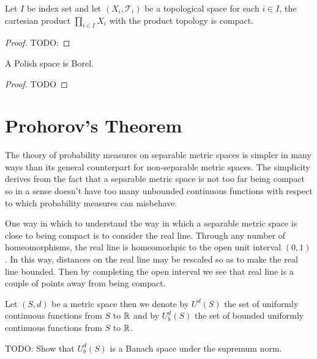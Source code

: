 \begin{thm}\label{Tychonoff}Let $I$ be index set
  and let $(X_i,
  \mathcal{T}_i)$ be a topological space for each $i \in I$, the
  cartesian product $\prod_{i \in I} X_i$ with the product topology is
  compact.
\end{thm}
\begin{proof}
TODO:
\end{proof}

\begin{thm}\label{PolishImpliesBorel}A Polish space is Borel.
\end{thm}
\begin{proof}
TODO
\end{proof}

\section{Prohorov's Theorem}

The theory of probability measures on separable metric spaces is simpler in many ways than its general counterpart 
for non-separable metric spaces. The simplicity derives from the fact that a separable metric space is not too far being compact
so in a sense doesn't have too many unbounded continuous functions with respect to which probability measures can misbehave.

One way in which to understand the way in which a separable metric space is close to being compact is to consider the real line.  Through any number of homeomorphisms, the real line is homeomorhpic to the open unit interval $(0,1)$.  In this way, distances on the real line may be rescaled so as to make the real line bounded.  Then by completing the open interval we see that real line is a couple of points away from being compact.

\begin{defn}Let $(S,d)$ be a metric space then we denote by $U^d(S)$ the set of uniformly continuous functions from $S$ to $\mathbb{R}$ and by $U_b^d(S)$ the set of bounded uniformly continuous functions from $S$ to $\mathbb{R}$.
\end{defn}
TODO: Show that $U^d_b(S)$ is a Banach space under the supremum norm.

